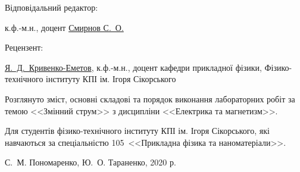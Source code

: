 {\begin{alwayssingle}
        \vspace*{2em}
		\noindent%
        \begin{minipage}[t]{0.2\linewidth}
            	\begin{flushleft}
                    Відповідальний редактор:
                \end{flushleft}
        \end{minipage}\hfill
        \begin{minipage}[t]{0.78\linewidth}
                к.ф.-м.н., доцент \href{http://ipt.kpi.ua/smirnov}{Смирнов С.~О.}
        \end{minipage}

        \vspace*{2em}
		\noindent%
        \begin{minipage}[t]{0.2\linewidth}
            	\begin{flushleft}
                    Рецензент:
                \end{flushleft}
        \end{minipage}\hfill
        \begin{minipage}[t]{0.78\linewidth}
                \href{http://apd.ipt.kpi.ua/blog/author/19}{Я.~Д.~Кривенко-Еметов}, к.ф.-м.н., доцент кафедри прикладної фізики, Фізико-технічного інституту КПІ ім. Ігоря Сікорського
        \end{minipage}

        \vfill

		Розглянуто зміст, основні складові та порядок виконання лабораторних робіт за темою <<Змінний струм>> з дисципліни <<Електрика та магнетизм>>. 

		Для студентів фізико-технічного інституту КПІ ім. Ігоря Сікорського, які навчаються за спеціальністю 105~<<Прикладна фізика та наноматеріали>>.
		
		\vfill
				
	\begin{flushright}
        \textcopyright{} С.~М. Пономаренко, Ю.~О. Тараненко, 2020 р.
    \end{flushright}
		\newpage%
	\end{alwayssingle}
}



